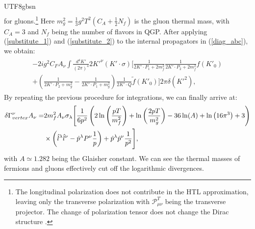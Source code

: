 \documentclass[11pt]{article}\def\baselinestretch{1.4}
\def\({\left(}
\def\){\right)}
\begin{document}
\begin{CJK}{UTF8}{gbsn}
\begin{align}
\end{align}
for gluons.\footnote{The longitudinal polarization does not contribute in the HTL approximation, leaving only the transverse polarization with $\mathcal{P}^T_{\mu \nu }$ being the transverse projector. The change of polarization tensor does not change the Dirac structure \cite{Lin:2023ass}.} Here $m_g^2=\frac{1}{3}g^2T^2(C_A+\frac{1}{2}N_f)$ is the gluon thermal mass, with $C_A=3$ and $N_f$ being the number of flavors in QGP.
 After applying (\ref{substitute_1}) and (\ref{substitute_2}) to the internal propagators in (\ref{diag_abc}), we obtain:
\begin{align}
\begin{split}
-2ig^2C_F A_\nu \int\frac{d^{4} K'}{( 2\pi )^{4}} 2K'^\nu (K' \cdot \sigma) \Big[ \frac{1}{2K'\cdot P_1+2m_f^2}\frac{1}{2K'\cdot P_2+2m_f^2}f(K'_0) \\
+ \left(\frac{1}{2K'\cdot P_2+m_g^2}-\frac{1}{2K'\cdot P_1+m_g^2}\right)\frac{1}{2K'\cdot Q}\tilde{f}(K'_0) \Big] 2\pi \delta (K'^2) ,
\end{split}
\end{align}
By repeating the previous procedure for integrations, we can finally arrive at:
\begin{align}\label{vertex_corr}
\delta \Gamma_{vertex} ^\nu A_\nu =& 2 m_f^2 A_\nu \sigma _\lambda \Bigg{[} \frac{1}{6 p^2}\(2 \ln \left(\frac{pT}{m_f^2}\right)+\ln \left(\frac{2 pT}{m_{g }^2}\right) 
-36 \ln (A)+\ln \left(16 \pi ^3 \right)+3\)\nonumber\\
&\times\left(\hat{l}^\lambda \hat{l}^\nu - \hat{p}^\lambda P^\nu \frac{1}{p} \right) + \hat{p}^\lambda \hat{p}^\nu \frac{1}{p^2} \Bigg{]},
\end{align}
with $A\simeq 1.282$ being the Glaisher constant. We can see the thermal masses of fermions and gluons effectively cut off the logarithmic divergences.


\end{CJK}
\end{document}

